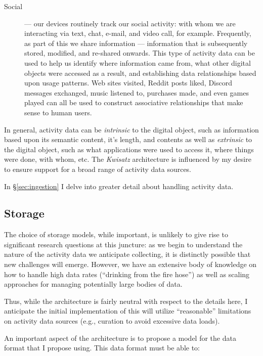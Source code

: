 \documentclass[sigconf,anonymous,review]{acmart}
\newcommand{\system}[0]{\emph{Kwisatz}\xspace}
\begin{document}
\begin{description}
    \item[Social] --- our devices routinely track our social activity: with whom
    we are interacting via text, chat, e-mail, and video call, for example.
    Frequently, as part of this we share information --- information that is
    subsequently stored, modified, and re-shared onwards.  This type of activity
    data can be used to help us identify where information came from, what other
    digital objects were accessed as a result, and establishing data
    relationships based upon usage patterns.  Web sites visited, Reddit posts
    liked, Discord messages exchanged, music listened to, purchases made, and
    even games played can all be used to construct associative relationships
    that make sense to human users.

\end{description}

In general, activity data can be \emph{intrinsic} to the digital object, such as
information based upon its semantic content, it's length, and contents as well
as \emph{extrinsic} to the digital object, such as what applications were used
to access it, where things were done, with whom, etc. The \system architecture
is influenced by my desire to ensure support for a broad range of activity data
sources.

In \S \ref{sec:ingestion} I delve into greater detail about handling activity
data.

\subsection{Storage}\label{sec:Architecture:Storage}

The choice of storage models, while important, is unlikely to give rise to
significant research questions at this juncture: as we begin to understand the
nature of the activity data we anticipate collecting, it is distinctly possible
that new challenges will emerge.  However, we have an extensive body of
knowledge on how to handle high data rates (``drinking from the fire hose'') as
well as scaling approaches for managing potentially large bodies of data.

Thus, while the architecture is fairly neutral with respect to the details here,
I anticipate the initial implementation of this will utilize ``reasonable''
limitations on activity data sources (e.g., curation to avoid excessive data
loads).

An important aspect of the architecture is to propose a model for the data
format that I propose using.  This data format must be able to:
\end{document}
